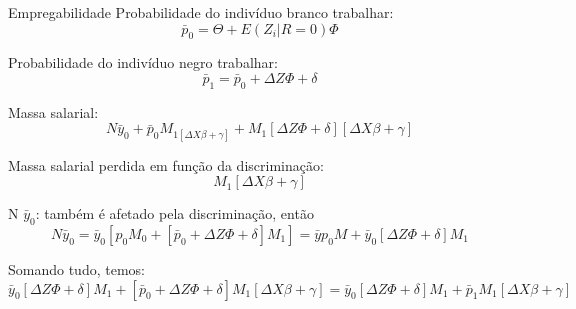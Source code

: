 \documentclass[10pt, xcolor=x11names,compress]{beamer}
\begin{document}
\begin{frame}{Empregabilidade}
	Probabilidade do indivíduo branco trabalhar:
	\begin{equation}
		\bar{p}_{0}= \Theta + E(Z_{i}|R=0) \Phi
	\end{equation}
	
		Probabilidade do indivíduo negro trabalhar:
	\begin{equation}
		\bar{p}_{1}= \bar{p}_{0} + \Delta Z \Phi + \delta
	\end{equation}
\end{frame}
	
\begin{frame}
	Massa salarial: 
	\begin{equation}
	N\bar{y}_{0} + \bar{p}_{0}M_{1[\Delta X\beta + \gamma ]} + M_{1}[\Delta Z\Phi + \delta][\Delta X\beta + \gamma]
	\end{equation}
	
	Massa salarial perdida em função da discriminação:
	\begin{equation}
		[\bar{p}_{0} + \Delta Z \Phi + \delta] M_{1}[\Delta X\beta + \gamma]
	\end{equation}
	
		N $\bar{y}_{0}$: também é afetado pela discriminação, então
		\begin{equation}
		N\bar{y}_{0} = \bar{y}_{0}[p_{0}M_{0} + [\bar{p}_{0} + \Delta Z\Phi + \delta]M_{1}] = \bar{y}p_{0}M + \bar{y}_{0}[\Delta Z\Phi + \delta]M_1
		\end{equation}
		
	Somando tudo, temos:
	\begin{equation}
	\bar{y}_{0}[\Delta Z\Phi + \delta]M_1 + [\bar{p}_{0} + \Delta Z\Phi + \delta]M_{1}[\Delta X\beta + \gamma] = \bar{y}_{0}[\Delta Z\Phi + \delta]M_1 + \bar{p}_{1}M_{1}[\Delta X\beta + \gamma]
	\end{equation}	
    \end{frame}
\end{document}
